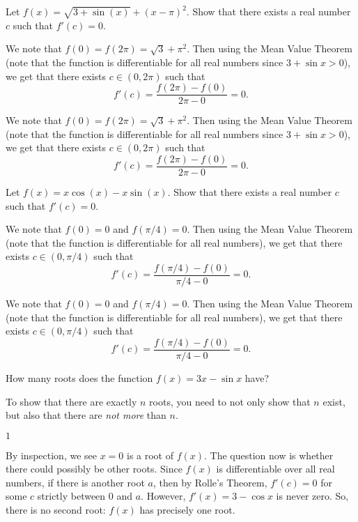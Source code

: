 \begin{question}[2015Q]
Let $f(x)=\sqrt{3 + \sin(x)} + (x - \pi)^2$. Show that there exists a real number $c$ such that $f'(c)=0$.
\end{question}
\begin{answer}
We note that $f(0)=f(2\pi)=\sqrt{3} + \pi^2$. Then using the Mean Value Theorem (note that
the function is differentiable for all real numbers since $3+\sin x>0$), we get that
there exists $c\in (0,2\pi)$ such that
$$f'(c)=\frac{f(2\pi)- f(0)}{2\pi - 0} = 0.$$
\end{answer}
\begin{solution}
We note that $f(0)=f(2\pi)=\sqrt{3} + \pi^2$. Then using the Mean Value Theorem (note that
the function is differentiable for all real numbers since $3+\sin x>0$), we get that
there exists $c\in (0,2\pi)$ such that
$$f'(c)=\frac{f(2\pi)- f(0)}{2\pi - 0} = 0.$$
\end{solution}


\begin{question}[2015Q]
Let $f(x)=x\cos(x) - x\sin(x)$. Show that there exists a real number $c$ such
that $f'(c)=0$.
\end{question}
\begin{answer}
We note that $f(0)=0$ and $f(\pi/4)=0$. Then using the Mean Value Theorem (note that the
function is differentiable for all real numbers), we get that there exists $c\in
(0,\pi/4)$ such that
$$f'(c)=\frac{f(\pi/4)- f(0)}{\pi/4 - 0} = 0.$$
\end{answer}
\begin{solution}
We note that $f(0)=0$ and $f(\pi/4)=0$. Then using the Mean Value Theorem (note that the
function is differentiable for all real numbers), we get that there exists $c\in
(0,\pi/4)$ such that
$$f'(c)=\frac{f(\pi/4)- f(0)}{\pi/4 - 0} = 0.$$
\end{solution}




\begin{Mquestion}
How many roots does the function $f(x)=3x-\sin x$ have?
\end{Mquestion}
\begin{hint}
To show that there are exactly $n$ roots, you need to not only show that $n$ exist, but also that there are \emph{not more} than $n$.
\end{hint}
\begin{answer} $1$
\end{answer}
\begin{solution}
By inspection, we see $x=0$ is a root of $f(x)$. The question now is whether there could possibly be other roots. Since $f(x)$ is differentiable over all real numbers, if there is another root $a$, then by Rolle's Theorem, $f'(c)=0$ for some $c$ strictly between $0$ and $a$. However, $f'(x)=3-\cos x$ is never zero. So, there is no second root: $f(x)$ has precisely one root.
\end{solution}




